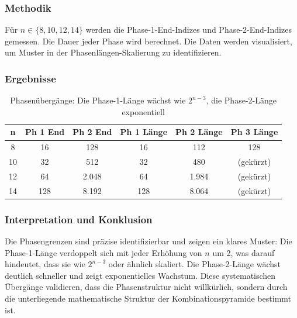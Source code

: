 ﻿\documentclass[a4paper,12pt]{article}
\theoremstyle{definition}
\begin{document}
\subsubsection{Methodik}

Für $n \in \{8, 10, 12, 14\}$ werden die Phase-1-End-Indizes und Phase-2-End-Indizes gemessen. Die Dauer jeder Phase wird berechnet. Die Daten werden visualisiert, um Muster in der Phasenlängen-Skalierung zu identifizieren.

\subsubsection{Ergebnisse}

\begin{table}[h]
	\centering
	\begin{tabular}{|c|c|c|c|c|c|}
		\hline
		\textbf{n} & \textbf{Ph 1 End} & \textbf{Ph 2 End} & \textbf{Ph 1 Länge} & \textbf{Ph 2 Länge} & \textbf{Ph 3 Länge} \\
		\hline
		8 & 16 & 128 & 16 & 112 & 128 \\
		\hline
		10 & 32 & 512 & 32 & 480 & (gekürzt) \\
		\hline
		12 & 64 & 2.048 & 64 & 1.984 & (gekürzt) \\
		\hline
		14 & 128 & 8.192 & 128 & 8.064 & (gekürzt) \\
		\hline
	\end{tabular}
	\caption{Phasenübergänge: Die Phase-1-Länge wächst wie $2^{n-3}$, die Phase-2-Länge exponentiell}
	\label{tab:exp08_phases}
\end{table}

\subsubsection{Interpretation und Konklusion}

Die Phasengrenzen sind präzise identifizierbar und zeigen ein klares Muster: Die Phase-1-Länge verdoppelt sich mit jeder Erhöhung von $n$ um 2, was darauf hindeutet, dass sie wie $2^{n-3}$ oder ähnlich skaliert. Die Phase-2-Länge wächst deutlich schneller und zeigt exponentielles Wachstum. Diese systematischen Übergänge validieren, dass die Phasenstruktur nicht willkürlich, sondern durch die unterliegende mathematische Struktur der Kombinationspyramide bestimmt ist.

\end{document}
